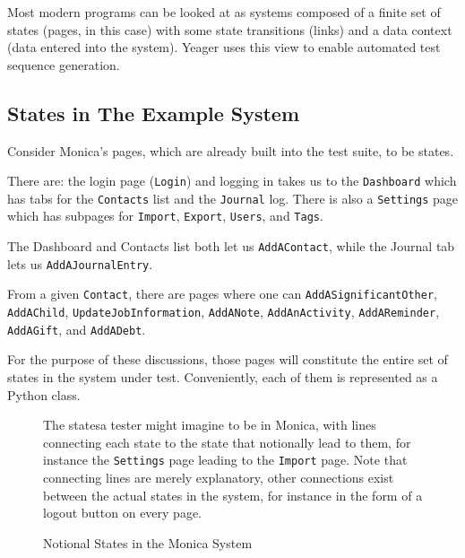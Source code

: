 Most modern programs can be looked at as systems composed of a finite set of states (pages, in this case) with some state transitions (links) and a data context (data entered into the system). Yeager uses this view to enable automated test sequence generation.

\subsection{States in The Example System}
Consider Monica's pages, which are already built into the test suite, to be states.

There are: the login page (\texttt{Login}) and logging in takes us to the \texttt{Dashboard} which has tabs for the \texttt{Contacts} list and the \texttt{Journal} log. There is also a \texttt{Settings} page which has subpages for \texttt{Import}, \texttt{Export}, \texttt{Users}, and \texttt{Tags}.

The Dashboard and Contacts list both let us \texttt{AddAContact}, while the Journal tab lets us \texttt{AddAJournalEntry}.

From a given \texttt{Contact}, there are pages where one can \texttt{AddASignificantOther}, \texttt{AddAChild}, \texttt{UpdateJobInformation}, \texttt{AddANote}, \texttt{AddAnActivity}, \texttt{AddAReminder}, \texttt{AddAGift}, and \texttt{AddADebt}.

For the purpose of these discussions, those pages will constitute the entire set of states in the system under test. Conveniently, each of them is represented as a Python class.

\begin{figure}
\noindent{}
\caption{Notional States in the Monica System}
The statesa tester might imagine to be in Monica, with lines connecting each state to the state that notionally lead to them, for instance the \texttt{Settings} page leading to the \texttt{Import} page. Note that connecting lines are merely explanatory, other connections exist between the actual states in the system, for instance in the form of a logout button on every page.
\end{figure}

